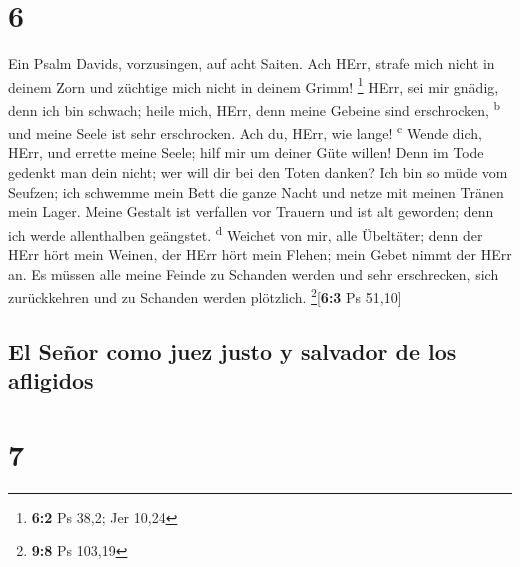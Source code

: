 \hypertarget{section-5}{%
\section{6}\label{section-5}}

 Ein Psalm Davids, vorzusingen, auf acht Saiten.
 Ach HErr, strafe mich nicht in deinem Zorn und züchtige
mich nicht in deinem Grimm! \footnote{\textbf{6:2} Ps 38,2; Jer 10,24}
 HErr, sei mir gnädig, denn ich bin schwach; heile mich,
HErr, denn meine Gebeine sind erschrocken, \textsuperscript{b}
 und meine Seele ist sehr erschrocken. Ach du, HErr, wie
lange! \textsuperscript{c}  Wende dich, HErr, und errette
meine Seele; hilf mir um deiner Güte willen!  Denn im Tode
gedenkt man dein nicht; wer will dir bei den Toten danken?
 Ich bin so müde vom Seufzen; ich schwemme mein Bett die
ganze Nacht und netze mit meinen Tränen mein Lager.  Meine
Gestalt ist verfallen vor Trauern und ist alt geworden; denn ich werde
allenthalben geängstet. \textsuperscript{d}  Weichet von
mir, alle Übeltäter; denn der HErr hört mein Weinen,  der
HErr hört mein Flehen; mein Gebet nimmt der HErr an.  Es
müssen alle meine Feinde zu Schanden werden und sehr erschrecken, sich
zurückkehren und zu Schanden werden plötzlich.
\footnote{\textbf{9:8} Ps 103,19}{[}\textbf{6:3} Ps 51,10{]}

\hypertarget{el-seuxf1or-como-juez-justo-y-salvador-de-los-afligidos}{%
\subsection{El Señor como juez justo y salvador de los
afligidos}\label{el-seuxf1or-como-juez-justo-y-salvador-de-los-afligidos}}

\hypertarget{section-6}{%
\section{7}\label{section-6}}

